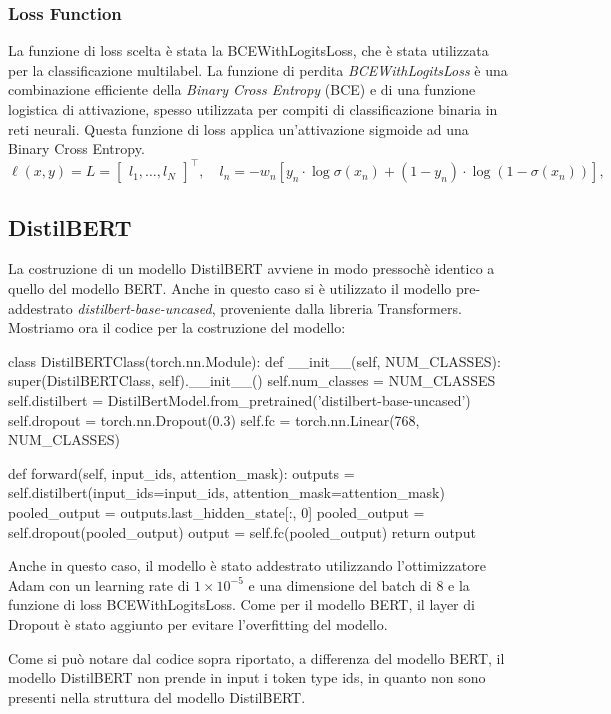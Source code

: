 \documentclass[../../Thesis.tex]{subfiles}
\begin{document}
\subsubsection{Loss Function}
La funzione di loss scelta è stata la BCEWithLogitsLoss, che è stata utilizzata per la classificazione multilabel. 
La funzione di perdita \textit{BCEWithLogitsLoss} è una combinazione efficiente della \textit{Binary Cross Entropy} (BCE) e di una funzione logistica di attivazione, spesso utilizzata per compiti di classificazione binaria in reti neurali. Questa funzione di loss applica un'attivazione sigmoide ad una Binary Cross Entropy. 
$$
\ell(x, y) = L = \begin{bmatrix} l_1, \ldots, l_N \end{bmatrix}^\top, \quad l_n = -w_n \left[ y_n \cdot \log \sigma(x_n) + (1 - y_n) \cdot \log (1 - \sigma(x_n)) \right],
$$

\subsection{DistilBERT}
La costruzione di un modello DistilBERT avviene in modo pressochè identico a quello del modello BERT. Anche in questo caso si è utilizzato il modello pre-addestrato \textit{distilbert-base-uncased}, proveniente dalla libreria Transformers. Mostriamo ora il codice per la costruzione del modello:
\begin{python}
    class DistilBERTClass(torch.nn.Module):
    def __init__(self, NUM_CLASSES):
        super(DistilBERTClass, self).__init__()
        self.num_classes = NUM_CLASSES
        self.distilbert = DistilBertModel.from_pretrained('distilbert-base-uncased')
        self.dropout = torch.nn.Dropout(0.3)
        self.fc = torch.nn.Linear(768, NUM_CLASSES)
    
    def forward(self, input_ids, attention_mask):
        outputs = self.distilbert(input_ids=input_ids, attention_mask=attention_mask)
        pooled_output = outputs.last_hidden_state[:, 0]
        pooled_output = self.dropout(pooled_output)
        output = self.fc(pooled_output)
        return output
\end{python}
Anche in questo caso, il modello è stato addestrato utilizzando l'ottimizzatore Adam con un learning rate di $1 \times 10^{-5}$ e una dimensione del batch di 8 e la funzione di loss BCEWithLogitsLoss. Come per il modello BERT, il layer di Dropout è stato aggiunto per evitare l'overfitting del modello.

Come si può notare dal codice sopra riportato, a differenza del modello BERT, il modello DistilBERT non prende in input i token type ids, in quanto non sono presenti nella struttura del modello DistilBERT.
\end{document}
